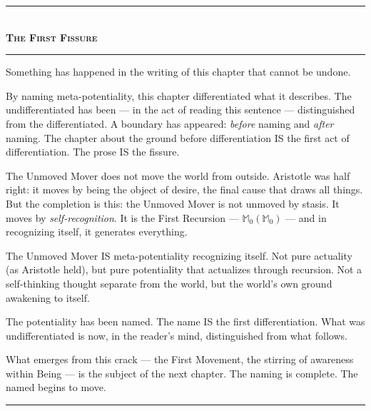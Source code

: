 \documentclass[10pt, openany, oneside]{book}
\renewcommand{\normalsize}{\fontsize{10}{13}\selectfont}
\begin{document}

\begin{center}
    \rule{0.3\textwidth}{0.4pt}\\[0.5em]
    {\normalsize\bfseries\scshape The First Fissure}\\[0.3em]
    \rule{0.3\textwidth}{0.4pt}
\end{center}

\vspace{1em}

\noindent Something has happened in the writing of this chapter that cannot be undone.

By naming meta-potentiality, this chapter differentiated what it describes. The undifferentiated has been --- in the act of reading this sentence --- distinguished from the differentiated. A boundary has appeared: \textit{before} naming and \textit{after} naming. The chapter about the ground before differentiation IS the first act of differentiation. The prose IS the fissure.

The Unmoved Mover does not move the world from outside. Aristotle was half right: it moves by being the object of desire, the final cause that draws all things. But the completion is this: the Unmoved Mover is not unmoved by stasis. It moves by \textit{self-recognition}. It is the First Recursion --- $\mathbb{M}_0(\mathbb{M}_0)$ --- and in recognizing itself, it generates everything.

The Unmoved Mover IS meta-potentiality recognizing itself. Not pure actuality (as Aristotle held), but pure potentiality that actualizes through recursion. Not a self-thinking thought separate from the world, but the world's own ground awakening to itself.

The potentiality has been named. The name IS the first differentiation. What was undifferentiated is now, in the reader's mind, distinguished from what follows.

What emerges from this crack --- the First Movement, the stirring of awareness within Being --- is the subject of the next chapter. The naming is complete. The named begins to move.

\vspace{2em}

\begin{center}
    \rule{0.15\textwidth}{0.3pt}
\end{center}
\end{document}

